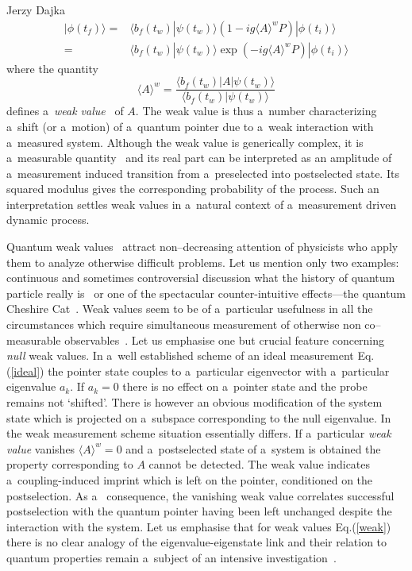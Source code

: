 \begin{artengenv}{Jerzy Dajka}
\begin{equation}
\begin{split}
    |\phi(t_f)\rangle= &\langle b_f(t_w)|\psi(t_w)\rangle \left( 1-ig\langle A\rangle^w P\right)|\phi(t_i)\rangle\\
    =&\langle b_f(t_w)|\psi(t_w)\rangle\exp(-ig\langle A\rangle^wP)|\phi(t_i)\rangle
\end{split}
\end{equation}
where the quantity
\begin{equation}\label{weak}
    \langle A\rangle^w=\frac{\langle b_f(t_w)|A|\psi(t_w)\rangle}{\langle b_f(t_w)|\psi(t_w)\rangle}
\end{equation}
 defines a~{\it weak value}~\parencite{primus} of $A$. The weak value is thus a~number characterizing
a~shift (or a~motion) of a~quantum pointer due to a~weak interaction with a~measured system. Although the weak value is generically  complex, it is a~measurable quantity~\parencite{weak_rmp} and its real part can be interpreted as an amplitude of a~measurement induced transition from a~preselected into postselected state. Its squared modulus gives the corresponding probability of the process. Such an interpretation settles  weak values in a~natural context of a~measurement driven dynamic process. 

Quantum weak values~\parencite{primus} attract non--decreasing attention of physicists who  apply them to analyze otherwise difficult problems. Let us mention only two examples: continuous and sometimes controversial discussion what the history of quantum particle really is~\parencite{PhysRevA.87.052104,PhysRevA.89.024102,PhysRevA.96.022126} or one of the  spectacular counter-intuitive effects---the quantum Cheshire Cat~\parencite{cat}. Weak values seem to be of a~particular usefulness in all the circumstances which  require simultaneous measurement of otherwise non co--measurable observables~\parencite{cat,weak,e20110854,Aharonov2008,weak_rmp}.  
%
Let us emphasise one but crucial feature concerning {\it null} weak values. In a~well established scheme of an ideal measurement Eq.(\ref{ideal}) the pointer state couples to a~particular eigenvector with a~particular eigenvalue $a_k$. If $a_k=0$ there is no effect on a~pointer state and the probe remains not `shifted'. There is however an obvious modification of the system state which is projected on a~subspace corresponding to the null eigenvalue. In the weak measurement scheme situation essentially differs. If a~particular {\it weak value} vanishes $\langle A\rangle^w=0$  and a~postselected state of a~system is obtained  the property corresponding to $A$ cannot be detected. The weak value indicates a~coupling-induced imprint which is left on the pointer, conditioned on the postselection. As a~ consequence, the vanishing weak value
correlates successful postselection with the quantum pointer having been left unchanged despite the interaction with the system. Let us emphasise that for  weak values Eq.(\ref{weak})  there is no clear analogy of the eigenvalue-eigenstate link and their relation to quantum properties remain a~subject of an intensive investigation~\parencite{Matzkin_prop,weak,e20110854}.


\end{artengenv}
